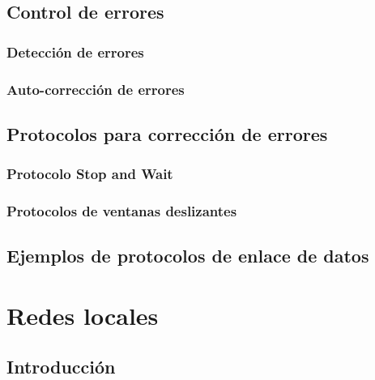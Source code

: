 \documentclass[
]{book}
\begin{document}
\hypertarget{control-de-errores}{%
\section{Control de errores}\label{control-de-errores}}

\hypertarget{detecciuxf3n-de-errores}{%
\subsection{Detección de errores}\label{detecciuxf3n-de-errores}}

\hypertarget{auto-correcciuxf3n-de-errores}{%
\subsection{Auto-corrección de errores}\label{auto-correcciuxf3n-de-errores}}

\hypertarget{protocolos-para-correcciuxf3n-de-errores}{%
\section{Protocolos para corrección de errores}\label{protocolos-para-correcciuxf3n-de-errores}}

\hypertarget{protocolo-stop-and-wait}{%
\subsection{Protocolo Stop and Wait}\label{protocolo-stop-and-wait}}

\hypertarget{protocolos-de-ventanas-deslizantes}{%
\subsection{Protocolos de ventanas deslizantes}\label{protocolos-de-ventanas-deslizantes}}

\hypertarget{ejemplos-de-protocolos-de-enlace-de-datos}{%
\section{Ejemplos de protocolos de enlace de datos}\label{ejemplos-de-protocolos-de-enlace-de-datos}}

\hypertarget{redes-locales}{%
\chapter{Redes locales}\label{redes-locales}}

\hypertarget{introducciuxf3n-2}{%
\section{Introducción}\label{introducciuxf3n-2}}
\end{document}
